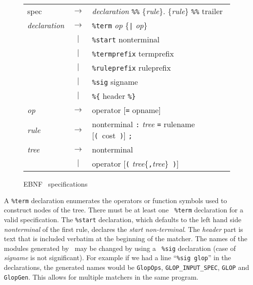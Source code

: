\begin{figure}[t]
\small
 \begin{center}
 \sl
 \begin{tabular}{lcl}
   spec	& $\rightarrow$ &  {\it declaration}
		   	   \verb.%%. \{{\it rule}\}
			   \verb.%%. trailer				\\[1ex]

   {\it declaration} 
	& $\rightarrow$ & {\tt \%term} {\it op} \{\verb.|. {\it op}\}	\\
    	& $\mid$	& {\tt \%start} nonterminal			\\
	& $\mid$	& {\tt \%termprefix} termprefix			\\
	& $\mid$	& {\tt \%ruleprefix} ruleprefix			\\
	& $\mid$	& {\tt \%sig} signame				\\
	& $\mid$	& \verb.%{. header \verb.%}.			\\[1ex]

   {\it op}
	& $\rightarrow$ & operator {\rm [}{\tt =} opname{\rm ]}		\\[1ex]

   {\it rule}
	& $\rightarrow$ & nonterminal \verb.:. {\it tree} \verb.=. 
			  rulename {\rm [}{\tt (~}cost{\tt ~)}{\rm ]} 
			  \verb.;.					\\[1ex]

   {\it tree}
	& $\rightarrow$ & nonterminal					\\[1ex]
	& $\mid$	& operator {\rm [}{\tt (}
			  {\it tree}\{\verb.,.{\it tree}\}{\tt ~)}{\rm ]}
 \end{tabular}
 \end{center}
\caption{EBNF \mlburg\ specifications}

\label{f:specification}
\end{figure}

A {\tt \%term} declaration enumerates the operators or function symbols
used to construct nodes of the tree.  There must be at least one {\tt
\%term} declaration for a valid specification.  The {\tt \%start}
declaration, which defaults to the left hand side {\sl nonterminal} of the
first rule, declares the {\em start non-terminal}. The {\sl header} part is
text that is included verbatim at the beginning of the matcher.  The names
of the modules generated by \mlburg\ may be changed by using a {\tt
\%sig} declaration (case of {\sl signame} is not significant).  For example
if we had a line ``\verb.%sig glop.'' in the declarations, the generated
names would be {\tt GlopOps}, {\tt GLOP\_INPUT\_SPEC}, {\tt GLOP} and {\tt
GlopGen}.  This allows for multiple matchers in the same program.

